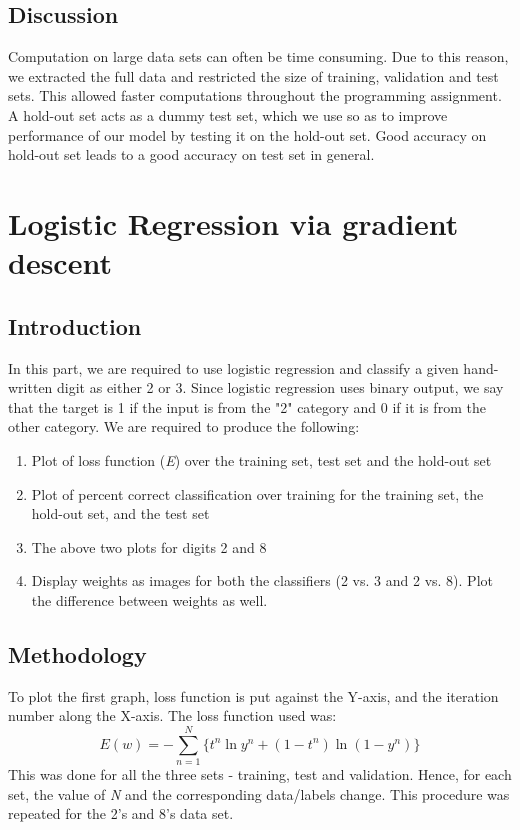 \documentclass{article}
\begin{document}
\subsection{Discussion}
Computation on large data sets can often be time consuming. Due to this reason, we extracted the full data and restricted the size of training, validation and test sets. This allowed faster computations throughout the programming assignment. A hold-out set acts as a dummy test set, which we use so as to improve performance of our model by testing it on the hold-out set. Good accuracy on hold-out set leads to a good accuracy on test set in general. 

\section{Logistic Regression via gradient descent}

\subsection{Introduction}
In this part, we are required to use logistic regression and classify a given hand-written digit as either 2 or 3. Since logistic regression uses binary output, we say that the target is 1 if the input is from the "2" category and 0 if it is from the other category. We are required to produce the following:
\begin{enumerate}
  \item Plot of loss function (\emph{E}) over the training set, test set and the hold-out set
  \item Plot of percent correct classification over training for the training set, the hold-out set, and the test set
  \item The above two plots for digits 2 and 8
  \item Display weights as images for both the classifiers (2 vs. 3 and 2 vs. 8). Plot the difference between weights as well.
\end{enumerate}

\subsection{Methodology}
To plot the first graph, loss function is put against the Y-axis, and the iteration number along the X-axis. The loss function used was:
$$E(w) = - \sum_{n=1}^{N} \{ t^{n} \ln y^{n} + ( 1-t^{n}) \ln(1-y^n)\}$$
This was done for all the three sets - training, test and validation. Hence, for each set, the value of \emph{N} and the corresponding data/labels change. This procedure was repeated for the 2's and 8's data set.
\end{document}
